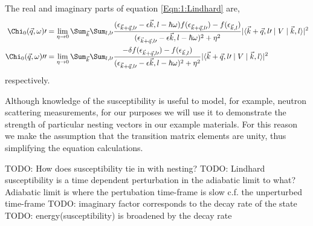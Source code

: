 The real and imaginary parts of equation \ref{Eqn:1:Lindhard} are,
\begin{align}
\Chi_0(\vec{q}, \omega)\prime &= \lim_{\eta \to 0} \Sum_{\vec{k}}\Sum_{l, l\prime}\frac{(\epsilon_{\vec{k}+\vec{q},l\prime} - \epsilon{\vec{k},l} - \hbar\omega) f(\epsilon_{\vec{k}+\vec{q},l\prime}) - f(\epsilon_{\vec{k},l})}{(\epsilon_{\vec{k}+\vec{q},l\prime} - \epsilon{\vec{k},l} - \hbar\omega)^2 + \eta^2}|\langle \vec{k}+\vec{q},l\prime \mid  V \mid \vec{k},l \rangle|^2 \\
\Chi_0(\vec{q}, \omega)\prime\prime &= \lim_{\eta \to 0} \Sum_{\vec{k}}\Sum_{l, l\prime}\frac{-\delta f(\epsilon_{\vec{k}+\vec{q},l\prime}) - f(\epsilon_{\vec{k},l})}{(\epsilon_{\vec{k}+\vec{q},l\prime} - \epsilon{\vec{k},l} - \hbar\omega)^2 + \eta^2}|\langle \vec{k}+\vec{q},l\prime \mid  V \mid \vec{k},l \rangle|^2 \\
\end{align}
respectively.

Although knowledge of the susceptibility is useful to model, for example, neutron scattering measurements, for our purposes we will use it to demonstrate the strength of particular nesting vectors in our example materials. For this reason we make the assumption that the transition matrix elements are unity, thus simplifying the equation calculations.


TODO: How does susceptibility tie in with nesting?
TODO: Lindhard susceptibility is a time dependent perturbation in the adiabatic limit to what? Adiabatic limit is where the pertubation time-frame is slow c.f. the unperturbed time-frame 
TODO: imaginary factor corresponds to the decay rate of the state
TODO: energy(susceptibility) is broadened by the decay rate




